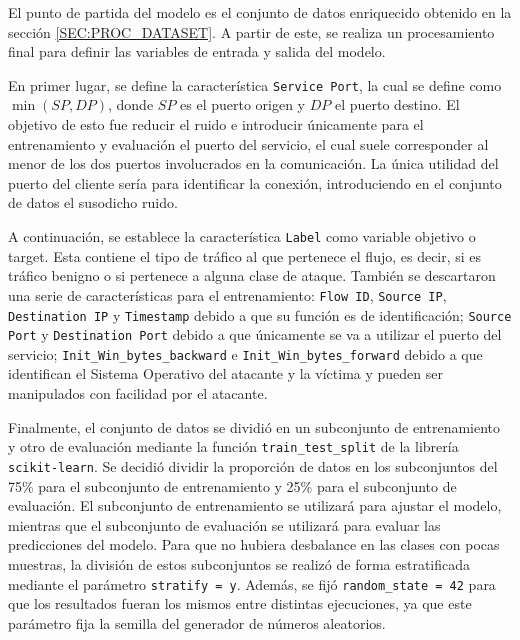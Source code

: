 El punto de partida del modelo es el conjunto de datos enriquecido obtenido en la sección \ref{SEC:PROC_DATASET}. A partir de este, se realiza un procesamiento final para definir las variables de entrada y salida del modelo.

En primer lugar, se define la característica \texttt{Service Port}, la cual se define como $\min(SP, DP)$, donde $SP$ es el puerto origen y $DP$ el puerto destino. El objetivo de esto fue reducir el ruido e introducir únicamente para el entrenamiento y evaluación el puerto del servicio, el cual suele corresponder al menor de los dos puertos involucrados en la comunicación. La única utilidad del puerto del cliente sería para identificar la conexión, introduciendo en el conjunto de datos el susodicho ruido.

A continuación, se establece la característica \texttt{Label} como variable objetivo o target. Esta contiene el tipo de tráfico al que pertenece el flujo, es decir, si es tráfico benigno o si pertenece a alguna clase de ataque. También se descartaron una serie de características para el entrenamiento: \texttt{Flow ID}, \texttt{Source IP}, \texttt{Destination IP} y \texttt{Timestamp} debido a que su función es de identificación; \texttt{Source Port} y \texttt{Destination Port} debido a que únicamente se va a utilizar el puerto del servicio; \texttt{Init\_Win\_bytes\_backward} e \texttt{Init\_Win\_bytes\_forward} debido a que identifican el Sistema Operativo del atacante y la víctima y pueden ser manipulados con facilidad por el atacante.

Finalmente, el conjunto de datos se dividió en un subconjunto de entrenamiento y otro de evaluación mediante la función \texttt{train\_test\_split} de la librería \texttt{scikit-learn}. Se decidió dividir la proporción de datos en los subconjuntos del 75\% para el subconjunto de entrenamiento y 25\% para el subconjunto de evaluación. El subconjunto de entrenamiento se utilizará para ajustar el modelo, mientras que el subconjunto de evaluación se utilizará para evaluar las predicciones del modelo. Para que no hubiera desbalance en las clases con pocas muestras, la división de estos subconjuntos se realizó de forma estratificada mediante el parámetro \texttt{stratify = y}. Además, se fijó \texttt{random\_state = 42} para que los resultados fueran los mismos entre distintas ejecuciones, ya que este parámetro fija la semilla del generador de números aleatorios.

